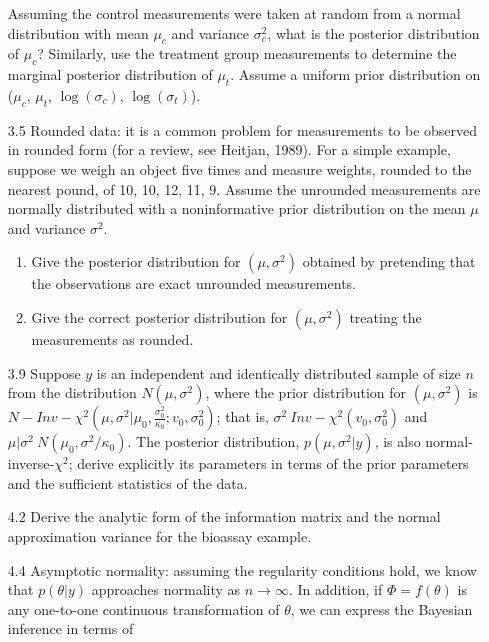 \documentclass[12pt,a4paper,twoside]{article}
\begin{document}
\begin{enumerate}
    Assuming the control measurements were taken at random from a normal distribution with mean $\mu_c$ and variance $\sigma^{2}_{c}$,
    what is the posterior distribution of $\mu_c$? Similarly, use the treatment group measurements to determine the marginal posterior
    distribution of $\mu_t$. Assume a uniform prior distribution on ($\mu_c$, $\mu_t$, $\log(\sigma_c)$, $\log(\sigma_t)$)\cite{Chapter3Exercises}.
    \item[3.5] Rounded data: it is a common problem for measurements to be observed in rounded form (for a review, see Heitjan, 1989).
    For a simple example, suppose we weigh an object five times and measure weights, rounded to the nearest pound, of 10, 10, 12, 11,
    9. Assume the unrounded measurements are normally distributed with a noninformative prior distribution on the mean $\mu$ and
    variance $\sigma^2$\cite{Chapter3Exercises}.
    \begin{enumerate}[label=$\alph*)$]
        \item Give the posterior distribution for $(\mu, \sigma^2)$ obtained by pretending that the observations are exact unrounded
        measurements.
        \item Give the correct posterior distribution for $(\mu, \sigma^2)$ treating the measurements as rounded.
    \end{enumerate}
    \item[3.9] Suppose $y$ is an independent and identically distributed sample of size $n$ from the distribution $N(\mu, \sigma^2)$, where the
    prior distribution for $(\mu, \sigma^2)$ is $N-Inv-\chi^2(\mu, \sigma^2|\mu_0, \frac{\sigma^2_0}{\kappa_0}; v_0, \sigma^{2}_{0})$; that is,
    $\sigma^2 ~ Inv-\chi^2(v_0, \sigma^2_0)$ and $\mu|\sigma^2 ~ N(\mu_0, \sigma^2/\kappa_ 0)$. The posterior distribution, $p(\mu, \sigma^2|y)$,
    is also normal-inverse-$\chi^2$; derive explicitly its parameters in terms of the prior parameters and the sufficient statistics of the
    data\cite{Chapter3Exercises}.
    \item[4.2] Derive the analytic form of the information matrix and the normal approximation variance for the bioassay
    example\cite{BioassayExample}\cite{Chapter4Exercises}.
    \item[4.4] Asymptotic normality: assuming the regularity conditions hold, we know that $p(\theta|y)$ approaches normality as $n \rightarrow \infty$.
    In addition, if $\Phi = f(\theta)$ is any one-to-one continuous transformation of $\theta$, we can express the Bayesian inference in terms of

\end{enumerate}
\end{document}
